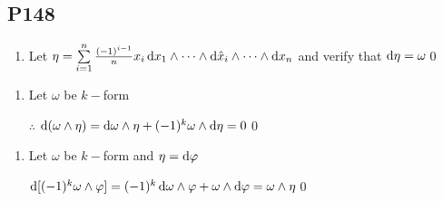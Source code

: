 \subsection{P148}
\begin{enumerate}[10]
    \item
    Let $\eta =\sum\limits_{i=1}^n \frac{(-1)^{i-1}}{n}x_i \dif x_1\wedge \cdots \wedge \dif \hat{x}_i \wedge \cdots \wedge \dif x_n$ and verify that $\dif\eta = \omega $\qed
    \end{enumerate}
    \begin{enumerate}[11]
    \item
    Let $\omega$ be $k-$form
    \par $\therefore$ $\textrm{d} (\omega \wedge \eta)=\dif\omega\wedge\eta+(-1)^k \omega\wedge \dif\eta =0$\qed
    \end{enumerate}
    \begin{enumerate}[12]
    \item
    Let $\omega$ be $k-$form and $\eta=\dif\varphi$
    \par $\textrm{d}[(-1)^k\omega\wedge\varphi]=(-1)^k\dif \omega\wedge \varphi+\omega \wedge \dif\varphi=\omega\wedge\eta $\qed
\end{enumerate}
